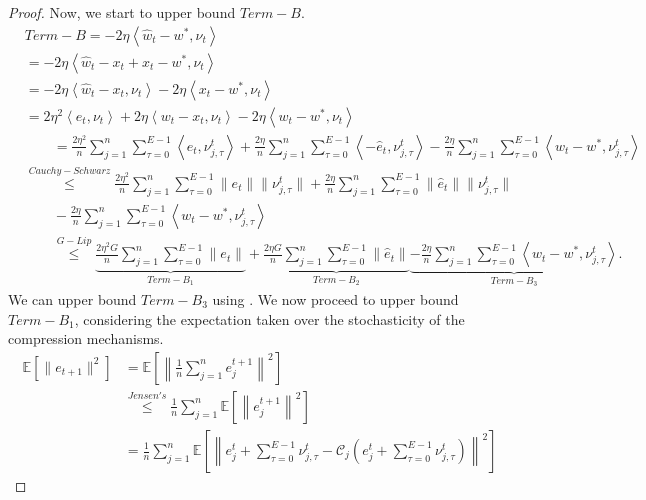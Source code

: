 \documentclass{article} %
\DeclareMathOperator{\E}{\E}
\def\C{{\mathcal C}}
\def\E{{\mathbb E}}
\begin{document}
\begin{proof}
Now, we start to upper bound $Term-B$.
\begin{align*}
    &Term-B = -2 \eta \left \langle\hat{w}_t - w^*,  \nu_t \right \rangle 
    \\
    &= -2 \eta \left \langle\hat{w}_t - x_t + x_t - w^*,  \nu_t \right \rangle
    \\
    & = -2 \eta \left \langle\hat{w}_t - x_t,  \nu_t \right \rangle -2 \eta \left \langle x_t - w^*,  \nu_t \right \rangle 
    \\
    & = 2 \eta^2 \left \langle e_t,  \nu_t \right \rangle + 2 \eta \left \langle w_t - x_t,  \nu_t \right \rangle -2\eta \left \langle w_t - w^*,  \nu_t \right \rangle
    \\
    &\qquad= \frac{2 \eta^2 }{n} \sum_{j=1}^n  \sum_{\tau=0}^{E-1} \left \langle e_t,  \nu_{j,\tau}^t  \right \rangle +  \frac{2 \eta}{n} \sum_{j=1}^n  \sum_{\tau=0}^{E-1}\left \langle -\hat{e}_t,  \nu_{j,\tau}^t \right \rangle - \frac{2 \eta}{n} \sum_{j=1}^n  \sum_{\tau=0}^{E-1} \left \langle w_t - w^*,  \nu_{j,\tau}^t \right \rangle
    \\
    &\overset{Cauchy-Schwarz}{\leq}\frac{2 \eta^2 }{n} \sum_{j=1}^n  \sum_{\tau=0}^{E-1}\|e_t\|\|\nu_{j,\tau}^t\| + \frac{2 \eta }{n} \sum_{j=1}^n  \sum_{\tau=0}^{E-1}\|\hat{e}_t\|\|\nu_{j,\tau}^t\| 
    \\
    &\qquad - \frac{2 \eta}{n} \sum_{j=1}^n  \sum_{\tau=0}^{E-1} \left \langle w_t - w^*,  \nu_{j,\tau}^t \right \rangle
    \\
    &\qquad\overset{G-Lip}{\leq}\underbrace{\frac{2 \eta^2 G}{n} \sum_{j=1}^n  \sum_{\tau=0}^{E-1}\|e_t\|}_{Term-B_1} + \underbrace{\frac{2 \eta G}{n} \sum_{j=1}^n  \sum_{\tau=0}^{E-1}\|\hat{e}_t\|}_{Term-B_2} \underbrace{- \frac{2 \eta}{n} \sum_{j=1}^n  \sum_{\tau=0}^{E-1} \left \langle w_t - w^*,  \nu_{j,\tau}^t \right \rangle}_{Term-B_3}.
\end{align*}
We can upper bound $Term-B_3$ using . We now proceed to upper bound $Term-B_1$, considering the expectation taken over the stochasticity of the compression mechanisms.
\begin{align*}
   \E[\|e_{t+1}\|^2] &= \E\left[\left\|\frac{1}{n}\sum_{j=1}^n e_j^{t+1}\right\|^2\right]
   \\
   &\overset{Jensen's}{\leq} \frac{1}{n}\sum_{j=1}^n \E\left[\left\| e_j^{t+1}\right\|^2\right]
   \\
   & = \frac{1}{n}\sum_{j=1}^n \E\left[\left\| e_j^t + \sum_{\tau=0}^{E-1}\nu_{j,\tau}^t - \C_j\left(e_j^t + \sum_{\tau=0}^{E-1}\nu_{j,\tau}^t\right) \right\|^2\right]

\end{align*}
\end{proof}
\end{document}
